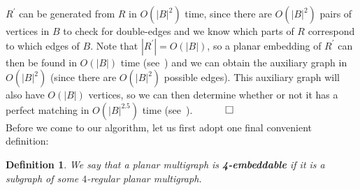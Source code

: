 \documentclass{article}
\newtheorem{Proof of Theorem}{Proof of Theorem}
\newtheorem{Definition}[Theorem]{Definition}
\begin{document}
 
$R^{\prime}$ can be generated from $R$ in $O \left( |B|^{2} \right)$ time,
since there are $O \left( |B|^{2} \right)$ pairs of vertices in $B$ to check for double-edges
and we know which parts of $R$ correspond to which edges of $B$.
Note that $|R^{\prime}|=O(|B|)$,
so a planar embedding of $R^{\prime}$ can then be found in $O(|B|)$ time (see~\cite{boo})
and we can obtain the auxiliary graph in $O \left( |B|^{2} \right)$
(since there are $O \left( |B|^{2} \right)$ possible edges).
This auxiliary graph will also have $O(|B|)$ vertices,
so we can then determine whether or not it has a perfect matching in $O \left( |B|^{2.5} \right)$ time (see~\cite{eve}).
$\phantom{qwerty}
\setlength{\unitlength}{.25cm}
\begin{picture}(1,1)
\put(0,0){\line(1,0){1}}
\put(0,0){\line(0,1){1}}
\put(1,1){\line(-1,0){1}}
\put(1,1){\line(0,-1){1}}
\end{picture}$ \\















Before we come to our algorithm,
let us first adopt one final convenient definition:















\begin{Definition}
We say that a planar multigraph is \emph{\textbf{4-embeddable}}
if it is a subgraph of some $4$-regular planar multigraph.
\end{Definition}
\end{document}
